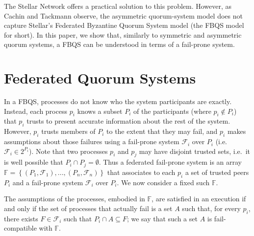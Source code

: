 \documentclass[11pt]{article}
\begin{document}
The Stellar Network offers a practical solution to this problem. However, as Cachin and Tackmann observe, the asymmetric quorum-system model does not capture Stellar's Federated Byzantine Quorum System model (the FBQS model for short). In this paper, we show that, similarly to symmetric and asymmetric quorum systems, a FBQS can be understood in terms of a fail-prone system.



\section{Federated Quorum Systems}

In a FBQS, processes do not know who the system participants are exactly.
Instead, each process $p_i$ knows a subset $P_i$ of the participants (where $p_i\not\in P_i$) that $p_i$ trusts to present accurate information about the rest of the system.
However, $p_i$ trusts members of $P_i$ to the extent that they may fail, and $p_i$ makes assumptions about those failures using a fail-prone system $\mathcal{F}_i$ over $P_i$ (i.e.\ $\mathcal{F}_i\in 2^{P_i}$).
Note that two processes $p_i$ and $p_j$ may have disjoint trusted sets, i.e.\ it is well possible that $P_i\cap P_j=\emptyset$.
Thus a federated fail-prone system is an array $\mathbb{F}=\left\{\left(P_1,\mathcal{F}_1\right),...,\left(P_n,\mathcal{F}_n\right)\right\}$ that associates to each $p_i$ a set of trusted peers $P_i$ and a fail-prone system $\mathcal{F}_i$ over $P_i$.%
We now consider a fixed such $\mathbb{F}$.

The assumptions of the processes, embodied in $\mathbb{F}$, are satisfied in an execution if and only if the set of processes that actually fail is a set $A$ such that, for every $p_i$, there exists $F\in\mathcal{F}_i$ such that $P_i\cap A \subseteq F$; we say that such a set $A$ is fail-compatible with $\mathbb{F}$.
\end{document}
